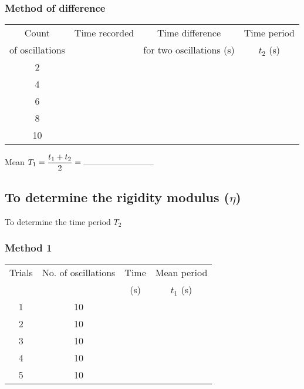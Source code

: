 \documentclass[12pt,a4paper]{article}
\begin{document}
			\subsubsection{Method of difference}
			 \begin{center}
			 	\begin{tabular}{|c|c|c|c|}
			 	\hline
			 	\rowcolor{b1!50}Count&	Time recorded&	Time difference&	Time period \\
			 	\rowcolor{b1!50}of oscillations& &for two oscillations (s) &$t_{2}$ (s) \\ \hline
			 	2& && \\ \hline
			 	4& && \\ \hline
			 	6& && \\ \hline
			 	8& && \\ \hline
			 	10& && \\ \hline					
			 \end{tabular}
				 
				 \vspace{11pt}
				 Mean $T_{1} = \dfrac{t_{1}+t_{2}}{2}= \rule{20ex}{0.2pt}$
			 \end{center}
		\subsection{To determine the rigidity modulus ($\eta$)}
			
			To determine the time period $T_{2}$
			\subsubsection{Method 1}
			\begin{center}
				\begin{tabular}{|c|c|c|c|}
					\hline
					\rowcolor{b1!50}Trials&	No. of oscillations&	Time&	Mean period \\
					\rowcolor{b1!50}& &(s) &$t_{1}$ (s) \\ \hline
					1& 10&& \\ \hline
					2& 10&& \\ \hline
					3& 10&& \\ \hline
					4& 10&& \\ \hline
					5& 10&& \\ \hline								
				\end{tabular}
			\end{center}
			
\end{document}
